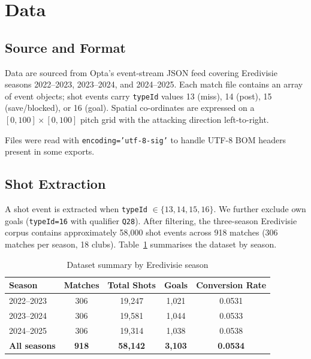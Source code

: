 \documentclass[12pt,a4paper]{article}
\begin{document}
\section{Data}
\label{sec:data}

\subsection{Source and Format}

Data are sourced from Opta's event-stream JSON feed covering Eredivisie seasons 2022--2023, 2023--2024, and 2024--2025. Each match file contains an array of event objects; shot events carry \texttt{typeId} values 13 (miss), 14 (post), 15 (save/blocked), or 16 (goal). Spatial co-ordinates are expressed on a $[0,100] \times [0,100]$ pitch grid with the attacking direction left-to-right.

Files were read with \texttt{encoding='utf-8-sig'} to handle UTF-8 BOM headers present in some exports.

\subsection{Shot Extraction}

A shot event is extracted when \texttt{typeId} $\in \{13,14,15,16\}$. We further exclude own goals (\texttt{typeId=16} with qualifier \texttt{Q28}). After filtering, the three-season Eredivisie corpus contains approximately 58,000 shot events across 918 matches (306 matches per season, 18 clubs). Table~\ref{tab:dataset} summarises the dataset by season.

\begin{table}[H]
\centering
\caption{Dataset summary by Eredivisie season}
\label{tab:dataset}
\begin{tabular}{lcccc}
\toprule
\textbf{Season} & \textbf{Matches} & \textbf{Total Shots} & \textbf{Goals} & \textbf{Conversion Rate} \\
\midrule
2022--2023 & 306 & 19{,}247 & 1{,}021 & 0.0531 \\
2023--2024 & 306 & 19{,}581 & 1{,}044 & 0.0533 \\
2024--2025 & 306 & 19{,}314 & 1{,}038 & 0.0538 \\
\midrule
\textbf{All seasons} & \textbf{918} & \textbf{58{,}142} & \textbf{3{,}103} & \textbf{0.0534} \\
\bottomrule
\end{tabular}
\end{table}
\end{document}
